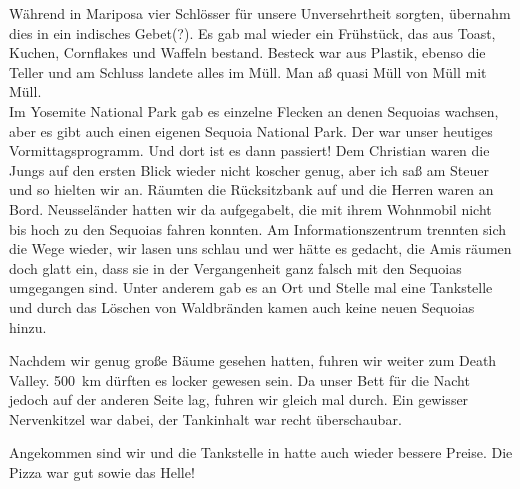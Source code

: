 Während in Mariposa vier Schlösser für unsere Unversehrtheit sorgten, übernahm dies in  ein indisches Gebet(?).
Es gab mal wieder ein Frühstück, das aus Toast, Kuchen, Cornflakes und Waffeln bestand.
Besteck war aus Plastik, ebenso die Teller und am Schluss landete alles im Müll.
Man aß quasi Müll von Müll mit Müll.\\

Im Yosemite National Park gab es einzelne Flecken an denen Sequoias wachsen, aber es gibt auch einen eigenen Sequoia National Park.
Der war unser heutiges Vormittagsprogramm.
Und dort ist es dann passiert!
Dem Christian waren die Jungs auf den ersten Blick wieder nicht koscher genug, aber ich saß am Steuer und so hielten wir an.
Räumten die Rücksitzbank auf und die Herren waren an Bord.
Neusseländer hatten wir da aufgegabelt, die mit ihrem Wohnmobil nicht bis hoch zu den Sequoias fahren konnten.
Am Informationszentrum trennten sich die Wege wieder, wir lasen uns schlau und wer hätte es gedacht, die Amis räumen doch glatt ein, dass sie in der Vergangenheit ganz falsch mit den Sequoias umgegangen sind.
Unter anderem gab es an Ort und Stelle mal eine Tankstelle und durch das Löschen von Waldbränden kamen auch keine neuen Sequoias hinzu.\\

\newpage
\thispagestyle{empty}
\newpage

Nachdem wir genug große Bäume gesehen hatten, fuhren wir weiter zum Death Valley.
500~km dürften es locker gewesen sein.
Da unser Bett für die Nacht jedoch auf der anderen Seite lag, fuhren wir gleich mal durch.
Ein gewisser Nervenkitzel war dabei, der Tankinhalt war recht überschaubar.

Angekommen sind wir und die Tankstelle in  hatte auch wieder bessere Preise.
Die Pizza war gut sowie das Helle!